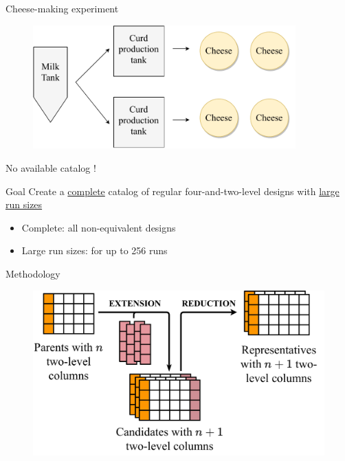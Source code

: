 \documentclass{beamer}
\begin{document}
\begin{frame}[t]
\begin{columns}[t]
\begin{column}{.49\textwidth}
\begin{exampleblock}{\sffamily \large Cheese-making experiment}
	\begin{figure}
		\centering
		\includegraphics[width=0.9\textwidth]{figures/diagrams-horizontal_no-header.pdf}
	\end{figure}
	
	{\color{red} \large No available catalog !}
	\end{exampleblock}
	
	\vspace{24pt}
	
	\begin{alertblock}{\sffamily \large Goal}
	    Create a {\color{kul-blue}\underline{complete}} catalog of regular four-and-two-level designs with {\color{kul-blue}\underline{large run sizes}}
    	\begin{itemize}
    	    \item {\color{kul-blue} Complete:} all non-equivalent designs
    	    \item {\color{kul-blue} Large run sizes:} for up to 256 runs
    	\end{itemize}
	\end{alertblock}
	
	\vspace{24pt}
	
	{\sffamily \color{kul-blue} \large Methodology}
	\vspace{24pt}
    \begin{figure}
		\centering
		\includegraphics[width=\textwidth]{figures/procedure3.pdf}
    \end{figure}
    

\end{column}
\end{columns}
\end{frame}
\end{document}
